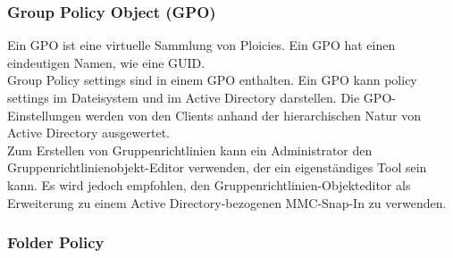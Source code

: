 \subsubsection{Group Policy Object (GPO)}
Ein GPO ist eine virtuelle Sammlung von Ploicies. 
Ein GPO hat einen eindeutigen Namen, wie eine GUID.\\

Group Policy settings sind in einem GPO enthalten. 
Ein GPO kann policy settings im Dateisystem und im Active Directory darstellen. 
Die GPO-Einstellungen werden von den Clients anhand der hierarchischen Natur von Active Directory ausgewertet.\\

Zum Erstellen von Gruppenrichtlinien kann ein Administrator den Gruppenrichtlinienobjekt-Editor verwenden, der ein eigenständiges Tool sein kann. 
Es wird jedoch empfohlen, den Gruppenrichtlinien-Objekteditor als Erweiterung zu einem Active Directory-bezogenen MMC-Snap-In zu verwenden.

\subsubsection{Folder Policy}
